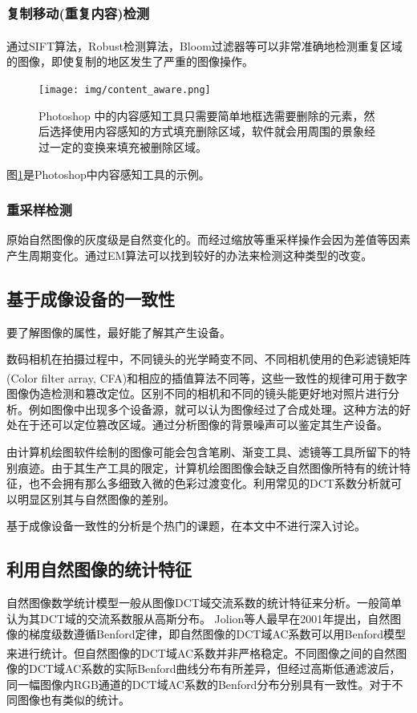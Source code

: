 \documentclass[a4paper, 10pt, notitlepage]{report}
\newcommand{\supercite}[1]{\textsuperscript{\cite{#1}}}
\begin{document}
			\subsubsection{复制移动(重复内容)检测}
				通过SIFT算法\supercite{huang2008detection}，Robust检测算法\supercite{popescu2004exposing}，Bloom过滤器等可以非常准确地检测重复区域的图像，即使复制的地区发生了严重的图像操作。

				\begin{figure}[ht]
					\centering
					\texttt{[image: img/content\_aware.png]}
					\caption{Photoshop 中的内容感知工具只需要简单地框选需要删除的元素，然后选择使用内容感知的方式填充删除区域，软件就会用周围的景象经过一定的变换来填充被删除区域。}
					\label{fig-contentaware}
				\end{figure}

				图\ref{fig-contentaware}是Photoshop中内容感知工具的示例。

			\subsubsection{重采样检测}
				原始自然图像的灰度级是自然变化的。而经过缩放等重采样操作会因为差值等因素产生周期变化。通过EM算法可以找到较好的办法来检测这种类型的改变。


		\subsection{基于成像设备的一致性}
			要了解图像的属性，最好能了解其产生设备。

			数码相机在拍摄过程中，不同镜头的光学畸变不同、不同相机使用的色彩滤镜矩阵 (Color filter array, CFA)和相应的插值算法不同等\supercite{林啟銘2008基於鄰近像素方向資訊之數位相機}，这些一致性的规律可用于数字图像伪造检测和篡改定位。区别不同的相机和不同的镜头能更好地对照片进行分析。例如图像中出现多个设备源，就可以认为图像经过了合成处理。这种方法的好处在于还可以定位篡改区域。通过分析图像的背景噪声可以鉴定其生产设备。

			由计算机绘图软件绘制的图像可能会包含笔刷、渐变工具、滤镜等工具所留下的特别痕迹。由于其生产工具的限定，计算机绘图图像会缺乏自然图像所特有的统计特征，也不会拥有那么多细致入微的色彩过渡变化。利用常见的DCT系数分析就可以明显区别其与自然图像的差别。

			基于成像设备一致性的分析是个热门的课题，在本文中不进行深入讨论。
		
		\subsection{利用自然图像的统计特征}
			自然图像数学统计模型一般从图像DCT域交流系数的统计特征来分析。一般简单认为其DCT域的交流系数服从高斯分布。
			Jolion等人最早在2001年提出，自然图像的梯度级数遵循Benford定律，即自然图像的DCT域AC系数可以用Benford模型来进行统计\supercite{jolion2001images}。但自然图像的DCT域AC系数并非严格稳定。不同图像之间的自然图像的DCT域AC系数的实际Benford曲线分布有所差异，但经过高斯低通滤波后，同一幅图像内RGB通道的DCT域AC系数的Benford分布分别具有一致性。对于不同图像也有类似的统计。
			
\end{document}
